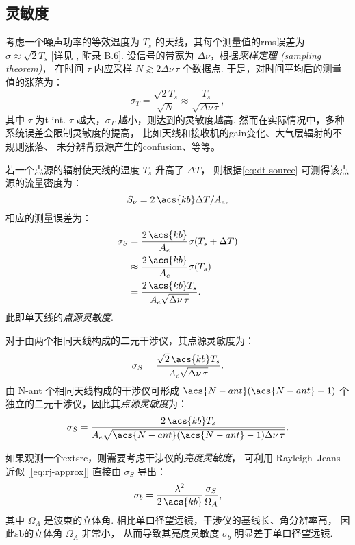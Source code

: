 \subsection{灵敏度}

考虑一个噪声功率的等效温度为 $T_s$ 的天线，其每个测量值的\ac{rms}误差为
$\sigma \approx \sqrt{2} T_s$
[详见 , 附录 B.6].
设信号的带宽为 $\Delta\nu$，根据\emph{采样定理 (sampling theorem)}，
在时间 $\tau$ 内应采样 $N \gtrsim 2 \Delta\nu \,\tau$ 个数据点.
于是，对时间平均后的测量值的涨落为：
\begin{equation}
  \label{eq:radiometer}
  \sigma_T = \frac{\sqrt{2} T_s}{\sqrt{N}}
    \approx \frac{T_s}{\sqrt{\Delta\nu \,\tau}} ,
\end{equation}
其中 $\tau$ 为\ac{t-int}.
$\tau$ 越大，$\sigma_T$ 越小，则达到的灵敏度越高.
然而在实际情况中，多种系统误差会限制灵敏度的提高，
比如天线和接收机的\ac{gain}变化、大气层辐射的不规则涨落、
未分辨背景源产生的\ac{confusion}、等等。

若一个点源的辐射使天线的温度 $T_s$ 升高了 $\Delta T$，
则根据\autoref{eq:dt-source} 可测得该点源的流量密度为：
\begin{equation}
  S_{\nu} = 2\,\acs{kb} \Delta T / A_e ,
\end{equation}
相应的测量误差为：
\begin{align}
  \sigma_S
    & = \frac{2\,\acs{kb}}{A_e} \sigma(T_s + \Delta T) \\
    & \approx \frac{2\,\acs{kb}}{A_e} \sigma(T_s) \\
    & = \frac{2\,\acs{kb} T_s}{A_e \sqrt{\Delta\nu \,\tau}} .
\end{align}
此即单天线的\emph{点源灵敏度}.

对于由两个相同天线构成的二元干涉仪，其点源灵敏度为：
\begin{equation}
  \label{eq:sigma-ps1}
  \sigma_S = \frac{\sqrt{2}\,\acs{kb} T_s}{A_e \sqrt{\Delta\nu \,\tau}} .
\end{equation}
由 \acs{N-ant} 个相同天线构成的干涉仪可形成 $\acs{N-ant}(\acs{N-ant}-1)$
个独立的二元干涉仪，因此其\emph{点源灵敏度}为：
\begin{equation}
  \label{eq:sigma-ps}
  \sigma_S = \frac{2\,\acs{kb} T_s}{
    A_e \sqrt{\acs{N-ant}(\acs{N-ant}-1) \Delta\nu \,\tau}} .
\end{equation}

如果观测一个\acf{extsrc}，则需要考虑干涉仪的\emph{亮度灵敏度}，
可利用 Rayleigh--Jeans 近似 [\autoref{eq:rj-approx}]
直接由 $\sigma_S$ 导出：
\begin{equation}
  \label{eq:sigma-tb}
  \sigma_b = \frac{\lambda^2}{2\,\acs{kb}} \frac{\sigma_S}{\Omega_A} ,
\end{equation}
其中 $\Omega_A$ 是波束的立体角.
相比单口径望远镜，干涉仪的基线长、角分辨率高，
因此\ac{sb}的立体角 $\Omega_A$ 非常小，
从而导致其亮度灵敏度 $\sigma_b$ 明显差于单口径望远镜.


